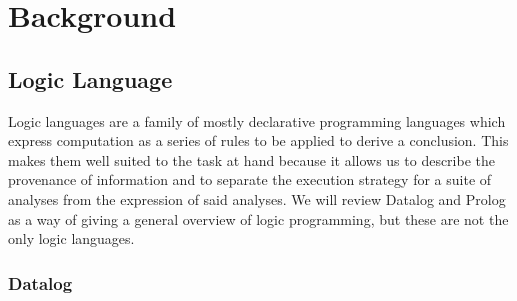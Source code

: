 \chapter{Background}
\label{chap:background}
\section{Logic Language}
Logic languages are a family of mostly declarative programming languages which express computation as a series of rules to be applied to derive a conclusion.
This makes them well suited to the task at hand because it allows us to describe the provenance of information and to separate the execution strategy for a suite of analyses from the expression of said analyses.
We will review Datalog and Prolog as a way of giving a general overview of logic programming, but these are not the only logic languages.
\subsection{Datalog}
\label{sec:fchain}
